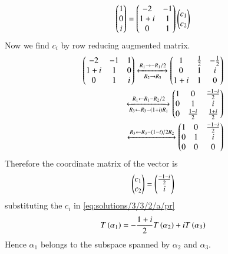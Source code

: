 \begin{align}
  \begin{pmatrix}1\\0\\i\end{pmatrix}=\begin{pmatrix}-2&-1\\1+i&1\\0&1\end{pmatrix}\begin{pmatrix}c{_1}\\c{_2}\end{pmatrix}
\end{align}
 Now we find $c{_i}$ by row reducing augmented matrix.
\begin{align}
    \begin{pmatrix}-2&-1&1\\1+i&1&0\\0&1&i\end{pmatrix}
    \xleftrightarrow[R_2\rightarrow R_3]{R_1\rightarrow -R_1/2}\begin{pmatrix}1&\frac{1}{2}&-\frac{1}{2}\\0&1&i\\1+i&1&0\end{pmatrix}\\
    \xleftrightarrow[R_3\leftarrow R_3-(1+i)R_1]{R_1\leftarrow R_1-R_2/2}\begin{pmatrix}1&0&\frac{-1-i}{2}\\0&1&i\\0&\frac{1-i}{2}&\frac{1+i}{2}\end{pmatrix}\\
    \xleftrightarrow{R_3\leftarrow R_3-(1-i)/2R_2}\begin{pmatrix}1&0&\frac{-1-i}{2}\\0&1&i\\0&0&0\end{pmatrix}
\end{align}
Therefore the coordinate matrix of the vector is 
\begin{align}
    \begin{pmatrix}c{_1}\\c{_2}\end{pmatrix}=
     \begin{pmatrix}\frac{-1-i}{2}\\i\end{pmatrix}
\end{align}
substituting the $c_{i}$ in \eqref{eq:solutions/3/3/2/a/pr}
\begin{align}
   T\left(\alpha_1\right)=-\frac{1+i}{2}T\left(\alpha_2\right) +iT\left(\alpha_3\right) 
\end{align}
 Hence $\alpha_1$ belongs to the subspace spanned by $\alpha_2$
and $\alpha_3$.

